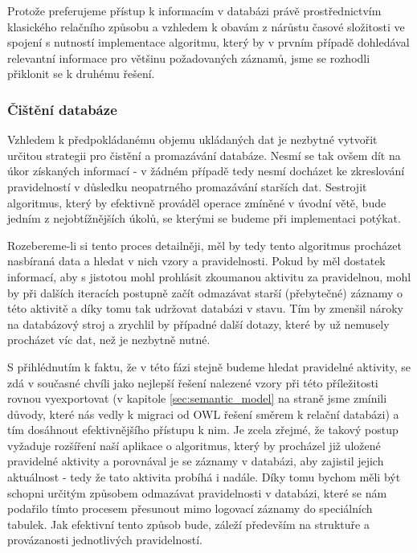 \documentclass[thesis=M,czech]{FITthesis}[2012/06/26]
\begin{document}
Protože preferujeme přístup k informacím v databázi právě prostřednictvím klasického relačního způsobu a vzhledem k obavám z nárůstu časové složitosti ve spojení s nutností implementace algoritmu, který by v prvním případě dohledával relevantní informace pro většinu požadovaných záznamů, jsme se rozhodli přiklonit se k druhému řešení.

\subsubsection*{Čištění databáze}
Vzhledem k předpokládanému objemu ukládaných dat je nezbytné vytvořit určitou strategii pro čistění a promazávání databáze. Nesmí se tak ovšem dít na úkor získaných informací - v žádném případě tedy nesmí docházet ke zkreslování pravidelností v důsledku neopatrného promazávání starších dat. Sestrojit algoritmus, který by efektivně prováděl operace zmíněné v úvodní větě, bude jedním z nejobtížnějších úkolů, se kterými se budeme při implementaci potýkat.

Rozebereme-li si tento proces detailněji, měl by tedy tento algoritmus procházet nasbíraná data a hledat v nich vzory a pravidelnosti. Pokud by měl dostatek informací, aby s jistotou mohl prohlásit zkoumanou aktivitu za pravidelnou, mohl by při dalších iteracích postupně začít odmazávat starší (přebytečné) záznamy o této aktivitě a díky tomu tak udržovat databázi v  stavu. Tím by zmenšil nároky na databázový stroj a zrychlil by případné další dotazy, které by už nemusely procházet víc dat, než je nezbytně nutné.

S přihlédnutím k faktu, že v této fázi stejně budeme hledat pravidelné aktivity, se zdá v současné chvíli jako nejlepší řešení nalezené vzory při této příležitosti rovnou vyexportovat (v kapitole \ref{sec:semantic_model} na straně \pageref{sec:semantic_model} jsme zmínili důvody, které nás vedly k migraci od OWL řešení směrem k relační databázi) a tím dosáhnout efektivnějšího přístupu k nim. Je zcela zřejmé, že takový postup vyžaduje rozšíření naší aplikace o algoritmus, který by procházel již uložené pravidelné aktivity a porovnával je se záznamy v databázi, aby zajistil jejich aktuálnost - tedy že tato aktivita probíhá i nadále. Díky tomu bychom měli být schopni určitým způsobem odmazávat pravidelnosti v databázi, které se nám podařilo tímto procesem přesunout mimo logovací záznamy do speciálních tabulek. Jak efektivní tento způsob bude, záleží především na struktuře a provázanosti jednotlivých pravidelností.
\end{document}
